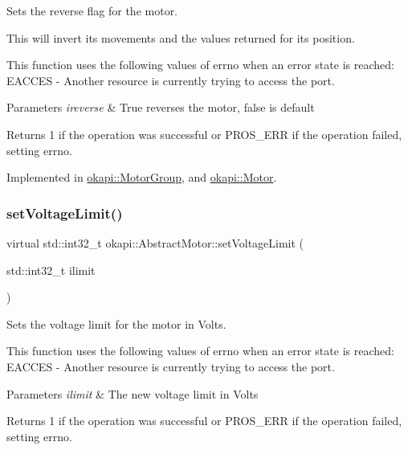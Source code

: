 Sets the reverse flag for the motor.

This will invert its movements and the values returned for its position.

This function uses the following values of errno when an error state is reached\+: E\+A\+C\+C\+ES -\/ Another resource is currently trying to access the port.


\begin{DoxyParams}{Parameters}
{\em ireverse} & True reverses the motor, false is default \\
\hline
\end{DoxyParams}
\begin{DoxyReturn}{Returns}
1 if the operation was successful or P\+R\+O\+S\+\_\+\+E\+RR if the operation failed, setting errno. 
\end{DoxyReturn}


Implemented in \mbox{\hyperlink{classokapi_1_1MotorGroup_a5655accbdc1b548bc75ec49d40337fe0}{okapi\+::\+Motor\+Group}}, and \mbox{\hyperlink{classokapi_1_1Motor_a558e94850abf85132811a8b281e872df}{okapi\+::\+Motor}}.

\mbox{\label{classokapi_1_1AbstractMotor_a2f33faf946b99cd34e9a591ccc33d644}} 
\subsubsection{\texorpdfstring{setVoltageLimit()}{setVoltageLimit()}}
{\footnotesize\ttfamily virtual std\+::int32\+\_\+t okapi\+::\+Abstract\+Motor\+::set\+Voltage\+Limit (\begin{DoxyParamCaption}\item[{std\+::int32\+\_\+t}]{ilimit }\end{DoxyParamCaption})\hspace{0.3cm}{\ttfamily [pure virtual]}}

Sets the voltage limit for the motor in Volts.

This function uses the following values of errno when an error state is reached\+: E\+A\+C\+C\+ES -\/ Another resource is currently trying to access the port.


\begin{DoxyParams}{Parameters}
{\em ilimit} & The new voltage limit in Volts \\
\hline
\end{DoxyParams}
\begin{DoxyReturn}{Returns}
1 if the operation was successful or P\+R\+O\+S\+\_\+\+E\+RR if the operation failed, setting errno. 
\end{DoxyReturn}


